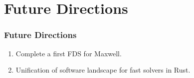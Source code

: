 \section{Future Directions}

\begin{frame}
    \frametitle{Future Directions}

    \begin{enumerate}
        \item Complete a first FDS for Maxwell.
        \item Unification of software landscape for fast solvers in Rust.
    \end{enumerate}

\end{frame}